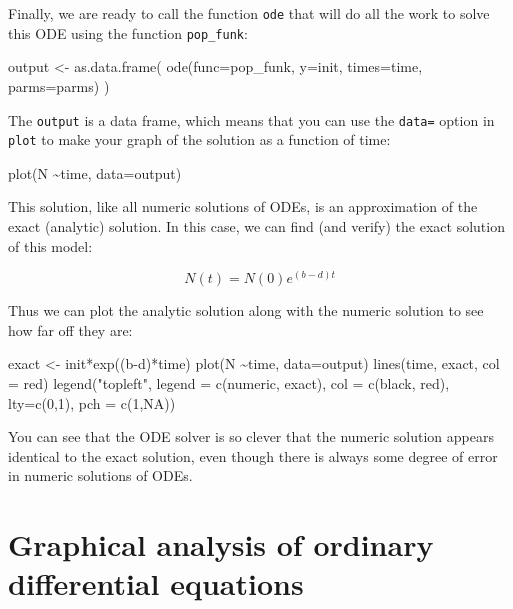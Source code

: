 \documentclass[
  letterpaper,
  DIV=11,
  numbers=noendperiod]{scrreprt}
\newenvironment{Shaded}{\begin{snugshade}}{\end{snugshade}}
\newcommand{\NormalTok}[1]{\textcolor[rgb]{0.00,0.23,0.31}{#1}}
\begin{document}
Finally, we are ready to call the function \texttt{ode} that will do all
the work to solve this ODE using the function \texttt{pop\_funk}:

\begin{Shaded}
\begin{Highlighting}[]
\NormalTok{output \textless{}{-} as.data.frame(}
\NormalTok{  ode(func=pop\_funk, y=init, times=time, parms=parms)}
\NormalTok{  )}
\end{Highlighting}
\end{Shaded}

The \texttt{output} is a data frame, which means that you can use the
\texttt{data=} option in \texttt{plot} to make your graph of the
solution as a function of time:

\begin{Shaded}
\begin{Highlighting}[]
\NormalTok{plot(N \textasciitilde{}time, data=output)}
\end{Highlighting}
\end{Shaded}

This solution, like all numeric solutions of ODEs, is an approximation
of the exact (analytic) solution. In this case, we can find (and verify)
the exact solution of this model:

\[ N(t) = N(0)e^{(b-d)t}\]

Thus we can plot the analytic solution along with the numeric solution
to see how far off they are:

\begin{Shaded}
\begin{Highlighting}[]
\NormalTok{exact \textless{}{-} init*exp((b{-}d)*time)}
\NormalTok{plot(N \textasciitilde{}time, data=output)}
\NormalTok{lines(time, exact, col = \textquotesingle{}red\textquotesingle{})}
\NormalTok{legend("topleft", legend = c(\textquotesingle{}numeric\textquotesingle{}, \textquotesingle{}exact\textquotesingle{}), col = c(\textquotesingle{}black\textquotesingle{}, \textquotesingle{}red\textquotesingle{}), lty=c(0,1), pch = c(1,NA))}
\end{Highlighting}
\end{Shaded}

You can see that the ODE solver is so clever that the numeric solution
appears identical to the exact solution, even though there is always
some degree of error in numeric solutions of ODEs.


\hypertarget{graphical-analysis-of-ordinary-differential-equations}{%
\chapter{Graphical analysis of ordinary differential
equations}\label{graphical-analysis-of-ordinary-differential-equations}}
\end{document}
